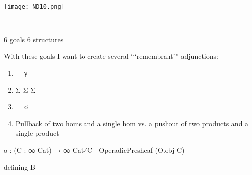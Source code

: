 \documentclass{book}
\theoremstyle{definition}
\begin{document}
\ \\

\begin{center}
\texttt{[image: ND10.png]} \\
\end{center}

\ \\

\iffalse 
Sorry, I lost this image.
\begin{center}
\texttt{[image: ND20.png]} \\
\end{center}
\fi


\newpage


6 goals
6 structures

With these goals I want to create several ```remembrant''' adjunctions:

\iffalse
\begin{center}
Ω${}^{∞}$ : ∞-Cat ⇄ C-InfinityCategory ∞-Cat
\end{center}
Ω${}^{∞}$ 
\fi




\begin{enumerate}
\item γ⃗ γ⃡ γ
\item Σ⃗ Σ⃡ Σ
\item σ⃗ σ⃡ σ
\item Pullback of two homs and a single hom vs. a pushout of two products and a single product
\end{enumerate}



\begin{center}
o⃗ : (C : ∞-Cat) → ∞-Cat⁄C ⭢ OperadicPresheaf (O⃗.obj C)
\end{center}

defining B






\iffalse
\end{document}

